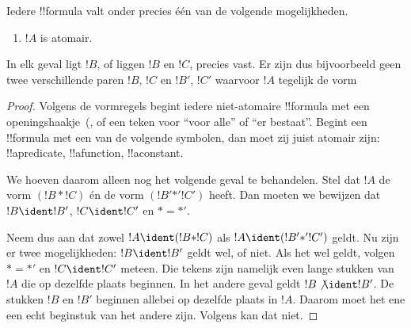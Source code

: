 \documentclass[openany]{memoir}
\begin{document}
\begin{prop}
Iedere !!{formula} valt onder precies één van de volgende mogelijkheden.
\begin{enumerate}
\item $!A$ is atomair.







\end{enumerate}
In elk geval ligt $!B$, of liggen $!B$ en $!C$, precies vast. Er
zijn dus bijvoorbeeld geen twee verschillende paren $!B$, $!C$ en
$!B'$, $!C'$ waarvoor $!A$ tegelijk de vorm
\end{prop}

\begin{proof}
Volgens de vormregels begint iedere niet-atomaire !!{formula} met een
openingshaakje~(,  of een teken voor
``voor alle'' of ``er bestaat''. Begint een
!!{formula} met een van de volgende symbolen, dan moet zij juist
atomair zijn: !!a{predicate}, !!a{function}, !!a{constant}.

We hoeven daarom alleen nog het volgende geval te behandelen. Stel dat
$!A$ de vorm $(!B \ast !C)$ én de vorm $(!B' \mathbin{\ast'} !C')$
heeft. Dan moeten we bewijzen dat $!B \ident !B'$, $!C \ident !C'$ en
$\ast = {\ast'}$.

Neem dus aan dat zowel $!A \ident (!B \ast !C)$ als $!A \ident (!B'
\mathbin{\ast'} !C')$ geldt. Nu zijn er twee mogelijkheden: $!B \ident
!B'$ geldt wel, of niet. Als het wel geldt, volgen $\ast = {\ast'}$ en
$!C \ident !C'$ meteen. Die tekens zijn namelijk even lange stukken
van $!A$ die op dezelfde plaats beginnen. In het andere geval geldt
$!B \not\ident !B'$. De stukken $!B$ en $!B'$ beginnen allebei op
dezelfde plaats in $!A$. Daarom moet het ene een echt beginstuk van het
andere zijn. Volgens  kan dat niet.
\end{proof}
\endgroup
\end{document}

